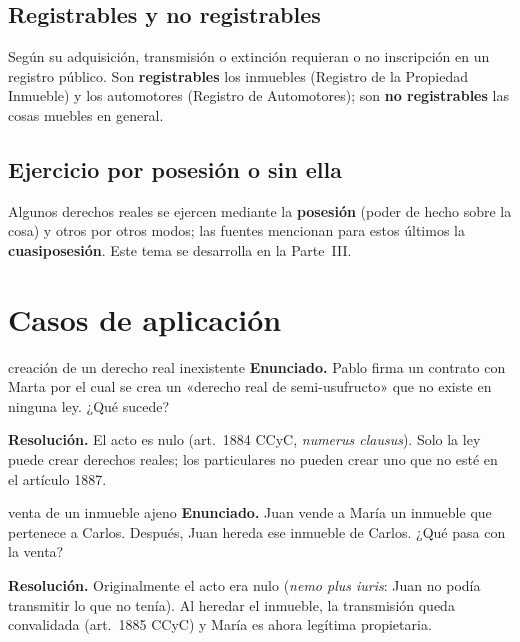 \documentclass[12pt,oneside]{book}
\begin{document}
\subsection{Registrables y no registrables}

Según su adquisición, transmisión o extinción requieran o no inscripción en un registro público. Son \textbf{registrables} los inmuebles (Registro de la Propiedad Inmueble) y los automotores (Registro de Automotores); son \textbf{no registrables} las cosas muebles en general.

\subsection{Ejercicio por posesión o sin ella}

Algunos derechos reales se ejercen mediante la \textbf{posesión} (poder de hecho sobre la cosa) y otros por otros modos; las fuentes mencionan para estos últimos la \textbf{cuasiposesión}. Este tema se desarrolla en la Parte~III.

\section{Casos de aplicación}

\begin{ejercicio}{creación de un derecho real inexistente}
\textbf{Enunciado.} Pablo firma un contrato con Marta por el cual se crea un «derecho real de semi-usufructo» que no existe en ninguna ley. ¿Qué sucede?

\textbf{Resolución.} El acto es nulo (art.~1884 CCyC, \textit{numerus clausus}). Solo la ley puede crear derechos reales; los particulares no pueden crear uno que no esté en el artículo 1887.
\end{ejercicio}

\begin{ejercicio}{venta de un inmueble ajeno}
\textbf{Enunciado.} Juan vende a María un inmueble que pertenece a Carlos. Después, Juan hereda ese inmueble de Carlos. ¿Qué pasa con la venta?

\textbf{Resolución.} Originalmente el acto era nulo (\textit{nemo plus iuris}: Juan no podía transmitir lo que no tenía). Al heredar el inmueble, la transmisión queda convalidada (art.~1885 CCyC) y María es ahora legítima propietaria.
\end{ejercicio}
\end{document}
